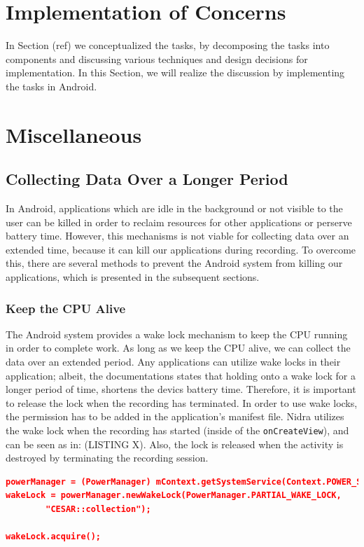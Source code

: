 \section{Implementation of Concerns}
In Section (ref) we conceptualized the tasks, by decomposing the tasks into components and discussing various techniques and design decisions for implementation. In this Section, we will realize the discussion by implementing the tasks in Android. 



\section{Miscellaneous}

\subsection{Collecting Data Over a Longer Period}
In Android, applications which are idle in the background or not visible to the user can be killed in order to reclaim resources for other applications or perserve battery time. However, this mechanisms is not viable for collecting data over an extended time, because it can kill our applications during recording. To overcome this, there are several methods to prevent the Android system from killing our applications, which is presented in the subsequent sections.

\subsubsection{Keep the CPU Alive}
The Android system provides a wake lock mechanism to keep the CPU running in order to complete work. As long as we keep the CPU alive, we can collect the data over an extended period. Any applications can utilize wake locks in their application; albeit, the documentations states that holding onto a wake lock for a longer period of time, shortens the devics battery time. Therefore, it is important to release the lock when the recording has terminated. In order to use wake locks, the permission has to be added in the application's manifest file. Nidra utilizes the wake lock when the recording has started (inside of the \verb|onCreateView|), and can be seen as in: (LISTING X). Also, the lock is released when the activity is destroyed by terminating the recording session.

\begin{lstlisting}[language=json, caption={My Caption}, captionpos=b]
powerManager = (PowerManager) mContext.getSystemService(Context.POWER_SERVICE);
wakeLock = powerManager.newWakeLock(PowerManager.PARTIAL_WAKE_LOCK,
        "CESAR::collection");

wakeLock.acquire();
\end{lstlisting}



